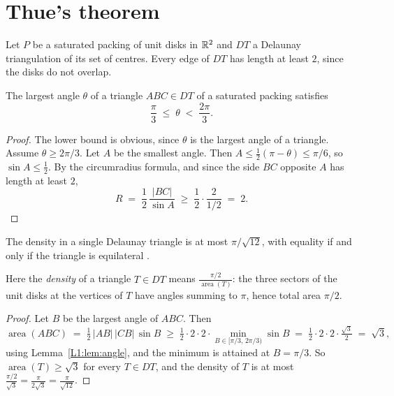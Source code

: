 \section{Thue's theorem}
\label{L1:sec:thue}

Let $P$ be a saturated packing of unit disks in $\mathbb{R}^2$ and $DT$ a Delaunay triangulation of its set of
centres. Every edge of $DT$ has length at least $2$, since the disks do not overlap.

\begin{lemma}
\label{L1:lem:angle}
The largest angle $\theta$ of a triangle $ABC\in DT$ of a saturated packing satisfies
\[
  \frac\pi3\;\le\;\theta\;<\;\frac{2\pi}3 .
\]
\end{lemma}

\begin{proof}
The lower bound is obvious, since $\theta$ is the largest angle of a triangle.
Assume $\theta\ge 2\pi/3$. Let $A$ be the smallest angle. Then $A\le\frac12(\pi-\theta)\le\pi/6$,
so $\sin A\le\frac12$. By the circumradius formula, and since the side $BC$ opposite $A$ has
length at least $2$,
\[
  R\;=\;\frac12\,\frac{|BC|}{\sin A}\;\ge\;\frac12\cdot\frac{2}{1/2}\;=\;2 .
\]
\end{proof}

\begin{lemma}
\label{L1:lem:triangle-density}
The density in a single Delaunay triangle is at most $\pi/\sqrt{12}$, with equality
if and only if the triangle is equilateral .
\end{lemma}
\begin{addedblock}
Here the \emph{density} of a triangle $T\in DT$ means $\frac{\pi/2}{\operatorname{area}(T)}$:
the three sectors of the unit disks at the vertices of $T$ have angles summing to $\pi$, hence total area $\pi/2$.
\end{addedblock}

\begin{proof}
Let $B$ be the largest angle of $ABC$. Then
\[
  \operatorname{area}(ABC)\;=\;\tfrac12\,|AB|\,|CB|\,\sin B
  \;\ge\;\tfrac12\cdot2\cdot2\cdot\min_{B\in[\pi/3,\,2\pi/3)}\sin B
  \;=\;\tfrac12\cdot2\cdot2\cdot\tfrac{\sqrt3}{2}\;=\;\sqrt3,
\]
using Lemma~\ref{L1:lem:angle}, and the minimum is attained at $B=\pi/3$. So $\operatorname{area}(T)\ge\sqrt3$
for every $T\in DT$, and the density of $T$ is at most $\frac{\pi/2}{\sqrt3}=\frac{\pi}{2\sqrt3}=\frac{\pi}{\sqrt{12}}$.
\end{proof}

